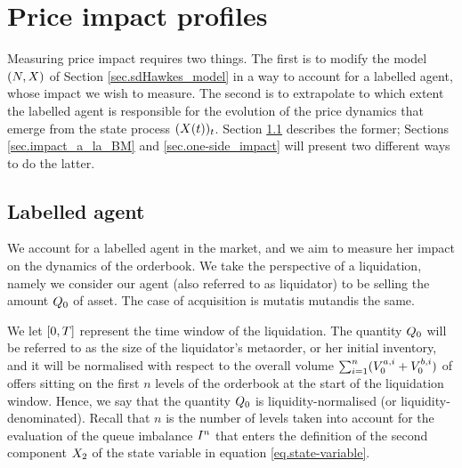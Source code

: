 \documentclass[10pt, article,table]{article}
\begin{document}
\section{Price impact profiles}\label{sec.price_impact_profiles}

Measuring price impact requires two things. The first is to modify the  model $(\multiCountingProc,\stateVariable)$ of Section \ref{sec.sdHawkes_model} in a way to account for a labelled agent, whose impact we wish to measure. The second is to extrapolate to which extent the labelled agent is responsible for the evolution of the price dynamics that emerge from the state process $(\stateVariable(t))_{t}$.  Section \ref{sec.labelled_agent} describes the former; Sections \ref{sec.impact_a_la_BM} and \ref{sec.one-side_impact} will present two different ways to do the latter.

\subsection{Labelled agent}\label{sec.labelled_agent}
We account for a labelled agent in the market, and we aim to measure her impact on the dynamics of the orderbook. We take the perspective of a liquidation, namely we consider our agent (also referred to as liquidator) to be selling the amount $\metaorderSize$ of asset. The case of acquisition is mutatis mutandis the same. 

We let $\timeWindow$ represent the time window of the liquidation. The quantity $\metaorderSize$ will be referred to as the size of the liquidator's metaorder, or her initial inventory, and it will be normalised with respect to the overall volume $\sum_{i=1}^{n}(\nthBestAskVolume[i]_{0} + \nthBestBidVolume[i]_{0})$ of offers sitting on the first $n$ levels of the orderbook  at the start of the liquidation window. Hence, we say that the quantity $\metaorderSize$ is liquidity-normalised (or liquidity-denominated). Recall that $n$ is the number of levels taken into account for the evaluation of the queue imbalance $\volumeImbalance^n$ that enters the definition of the second component $\stateVariable_2$ of the state variable in equation \eqref{eq.state-variable}.     
\end{document}
